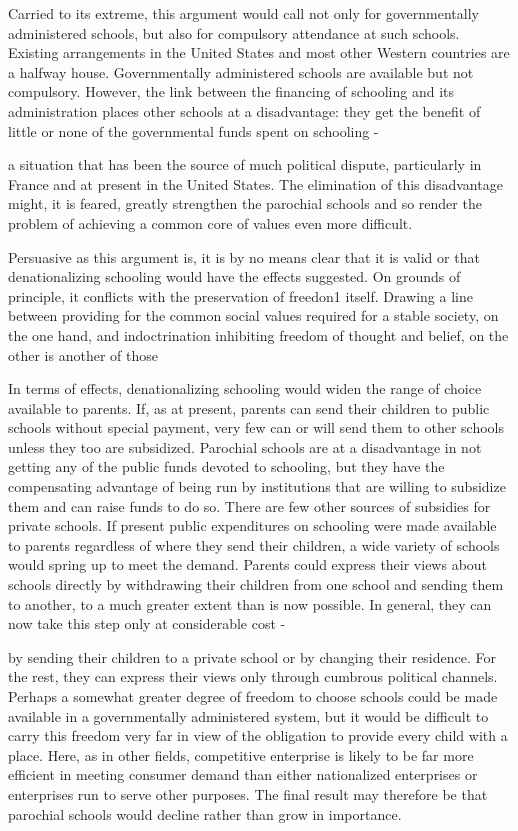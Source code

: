 \documentclass[11pt,openany]{book}
\begin{document}
Carried to its extreme, this argument would call not only for governmentally administered schools, but also for compulsory attendance at such schools. Existing arrangements in the United States and most other Western countries are a halfway house. Governmentally administered schools are available but not compulsory. However, the link between the financing of schooling and its administration places other schools at a disadvantage: they get the benefit of little or none of the governmental funds spent on schooling -

a situation that has been the source of much political dispute, particularly in France and at present in the United States. The elimination of this disadvantage might, it is feared, greatly strengthen the parochial schools and so render the problem of achieving a common core of values even more difficult.

Persuasive as this argument is, it is by no means clear that it is valid or that denationalizing schooling would have the effects suggested. On grounds of principle, it conflicts with the preservation of freedon1 itself. Drawing a line between providing for the common social values required for a stable society, on the one hand, and indoctrination inhibiting freedom of thought and belief, on the other is another of those

In terms of effects, denationalizing schooling would widen the range of choice available to parents. If, as at present, parents can send their children to public schools without special payment, very few can or will send them to other schools unless they too are subsidized. Parochial schools are at a disadvantage in not getting any of the public funds devoted to schooling, but they have the compensating advantage of being run by institutions that are willing to subsidize them and can raise funds to do so. There are few other sources of subsidies for private schools. If present public expenditures on schooling were made available to parents regardless of where they send their children, a wide variety of schools would spring up to meet the demand. Parents could express their views about schools directly by withdrawing their children from one school and sending them to another, to a much greater extent than is now possible. In general, they can now take this step only at considerable cost -

by sending their children to a private school or by changing their residence. For the rest, they can express their views only through cumbrous political channels. Perhaps a somewhat greater degree of freedom to choose schools could be made available in a governmentally administered system, but it would be difficult to carry this freedom very far in view of the obligation to provide every child with a place. Here, as in other fields, competitive enterprise is likely to be far more efficient in meeting consumer demand than either nationalized enterprises or enterprises run to serve other purposes. The final result may therefore be that parochial schools would decline rather than grow in importance.
\end{document}
